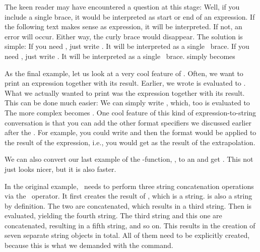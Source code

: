 %
The keen reader may have encountered a question at this stage:
\emph{}
Well, if you include a single brace, it would be interpreted as start or end of an expression.
If the following text makes sense as expression, it will be interpreted.
If not, an error will occur.
Either way, the curly brace would disappear.
The solution is simple:
If you need \inQuotes{\textbraceleft}, just write \inQuotes{\textbraceleft\textbraceleft}.\pythonIdx{\textbraceleft}\pythonIdx{\textbraceleft\textbraceleft}
It will be interpreted as a single \inQuotes{\textbraceleft}~brace.
If you need \inQuotes{\textbraceright}, just write \inQuotes{\textbraceright\textbraceright}.\pythonIdx{\textbraceright}\pythonIdx{\textbraceright\textbraceright}
It will be interpreted as a single \inQuotes{\textbraceright}~brace.
 simply becomes 

As the final example, let us look at a very cool feature of .
Often, we want to print an expression together with its result.
Earlier, we wrote  is evaluated to .
What we actually wanted to print was the expression  together with its result.
This can be done much easier:
We can simply write , which, too is evaluated to 
The more complex  becomes .
One cool feature of this kind of expression-to-string conversation is that you can add the other format specifiers we discussed earlier after the \pythonil{=}.
For example, you could write  and then the  format would be applied to the result of the expression, i.e., you would get  as the result of the extrapolation.%
%
\begin{sloppypar}%
We can also convert our last example of the \nobreakdashes-function, , to an  and get .
This not just looks nicer, but it is also faster.%
\end{sloppypar}%
%
In the original example, \python\ needs to perform three string concatenation operations via the \pythonil{+}~operator.
It first creates the result of , which is a string.
 is also a string by definition.
The two are concatenated, which results in a third string.
Then  is evaluated, yielding the fourth string.
The third string and this one are concatenated, resulting in a fifth string, and so on.
This results in the creation of seven separate string objects in total.
All of them need to be explicitly created, because this is what we demanded with the command.

